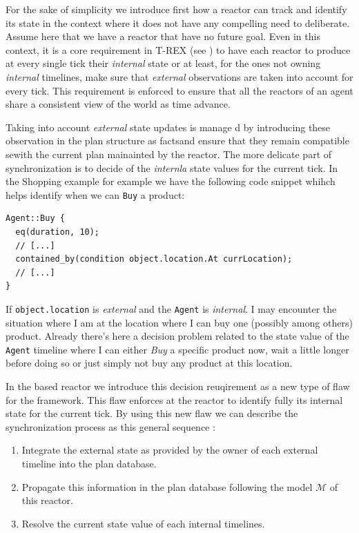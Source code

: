 For the sake of simplicity we introduce first how a reactor can track
and identify its state in the context where it does not have any
compelling need to deliberate. Assume here that we have a reactor that
have no future goal. Even in this context, it is a core requirement in
T-REX (see \cite{py10}) to have each reactor to produce at every
single tick their {\em internal} state or at least, for the ones not owning
{\em internal} timelines, make sure that {\em external} observations
are taken into account for every tick. This requirement is enforced to
ensure that all the reactors of an agent share a consistent view of
the world as time advance. 

Taking into account {\em external} state updates is manage d by
introducing these observation in the plan structure as factsand ensure
that they remain compatible sewith the current plan mainainted by the
reactor. The more delicate part of synchronization is to decide of the 
{\em internla} state values for the current tick. In the Shopping
example for example we have the following code snippet whihch helps
identify when we can \texttt{Buy} a product:
\begin{verbatim}
Agent::Buy {
  eq(duration, 10);
  // [...]
  contained_by(condition object.location.At currLocation);
  // [...]
}
\end{verbatim}
If \texttt{object.location} is {\em external} and the \texttt{Agent}
is {\em internal}. I may encounter the situation where I am at the
location where I can buy one (possibly among others) product. Already
there's here  a decision problem related to the state value of the
\texttt{Agent} timeline where I can either {\em Buy} a specific
product now, wait a little longer before doing so or just simply not
buy any product at this location.

In the \eu based reactor we introduce this decision reuqirement 
as a new type of flaw for the \eu framework. This flaw enforces at the
reactor to identify fully its internal state for the current tick. By
using this new flaw we can describe the synchronization process as
this general sequence :

\begin{enumerate}

\item Integrate the external state as provided by the owner of each
  external timeline into the plan database.

\item Propagate this information in the plan database following the
  model $\mathcal{M}$ of this reactor.

\item Resolve the current state value of each internal timelines.

\end{enumerate}

